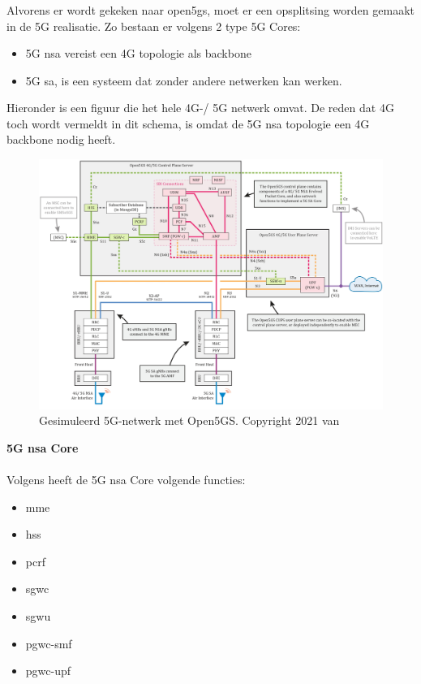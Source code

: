 \subsubsection{}
\label{sec:open5gs}

Alvorens er wordt gekeken naar \gls{open5gs}, moet er een opsplitsing worden gemaakt in de 5G realisatie.
Zo bestaan er volgens \textcite{Lee2025a} 2 type 5G Cores:

\begin{itemize}
  \item 5G \gls{nsa} vereist een 4G topologie als backbone
  \item 5G \gls{sa}, is een systeem dat zonder andere netwerken kan werken.
\end{itemize}

Hieronder is een figuur die het hele 4G-/ 5G netwerk omvat. De reden dat 4G toch wordt vermeldt in dit schema, is omdat de 5G \gls{nsa} topologie een 4G backbone nodig heeft. \autocite{Lee2025a}

\begin{figure}[H]
  \includegraphics[width=\linewidth]{../graphics/Open5GS-Schema.jpg}
  \caption{Gesimuleerd 5G-netwerk met Open5GS. \autocite[Door][]{Lee2021} Copyright 2021 van \textcite{Lee2021}}
  \label{fig:open5gs-schema}
\end{figure}

\textbf{5G \gls{nsa} Core}\\\\
Volgens \textcite{Lee2025a} heeft de 5G \gls{nsa} Core volgende functies:

\begin{itemize}
  \item \gls{mme}
  \item \gls{hss}
  \item \gls{pcrf}
  \item \gls{sgwc}
  \item \gls{sgwu}
  \item \gls{pgwc-smf}
  \item \gls{pgwc-upf}
\end{itemize}

